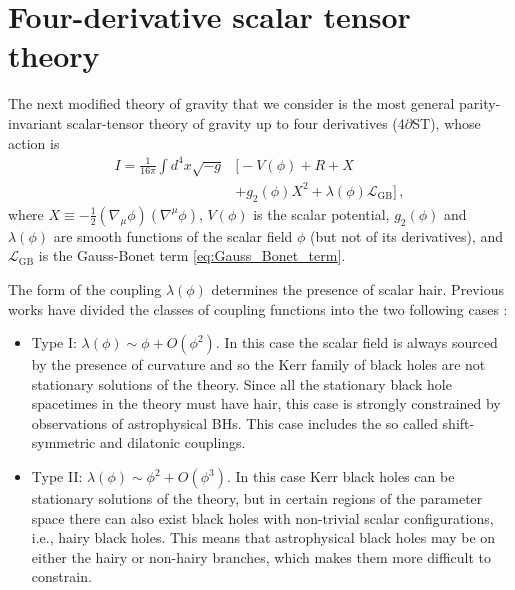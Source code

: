 \documentclass[reprint,aps,amsmath,amssymb,twoside,prd,showkeys,superscriptaddress,nofootinbib]{revtex4-2}
\begin{document}
\section{Four-derivative scalar tensor theory}
\label{sec:esgb}

The next modified theory of gravity that we consider is the most general parity-invariant scalar-tensor theory of gravity up to four derivatives (4$\partial$ST), whose action is \cite{Weinberg:2008hq}
\begin{equation}
\label{eq:action}
    \begin{aligned}
    I = \frac{1}{16\pi}\int d^4x\sqrt{-g}&\big[-V(\phi)+R+X\\
    &+g_2(\phi)X^2+\lambda(\phi)\mathcal{L}_\text{GB}\big]\,,
    \end{aligned}
\end{equation}
where $X\equiv-\frac{1}{2}(\nabla_\mu\phi)(\nabla^\mu\phi)$, $V(\phi)$ is the scalar potential, $g_2(\phi)$ and $\lambda(\phi)$ are smooth functions of the scalar field $\phi$ (but not of its derivatives), and $\mathcal{L}_\text{GB}$ is the Gauss-Bonet term \eqref{eq:Gauss_Bonet_term}. 

The form of the coupling $\lambda(\phi)$ determines the presence of scalar hair. Previous works have divided the classes of coupling functions into the two following cases \cite{Elley:2022ept,R:2022hlf}:
\begin{itemize}
    \item Type I: $\lambda(\phi) \sim \phi + O(\phi^2)$. In this case the scalar field is always sourced by the presence of curvature and so the Kerr family of black holes are not stationary solutions of the theory. Since all the stationary black hole spacetimes in the theory must have hair, this case is strongly constrained by observations of astrophysical BHs. This case includes the so called shift-symmetric and dilatonic couplings.
    \item Type II: $\lambda(\phi) \sim \phi^2 + O(\phi^3)$. In this case Kerr black holes can be stationary solutions of the theory, but in certain regions of the parameter space there can also exist black holes with non-trivial scalar configurations, i.e., hairy black holes. This means that astrophysical black holes may be on either the hairy or non-hairy branches, which makes them more difficult to constrain.
\end{itemize}
\end{document}
